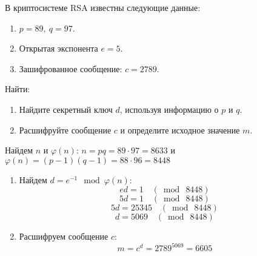 \begin{problem}
    В криптосистеме RSA известны следующие данные:
    \begin{enumerate}
        \item $p = 89, \ q = 97$.
        \item Открытая экспонента $e = 5$.
        \item Зашифрованное сообщение: $c = 2789$.
    \end{enumerate}
    Найти:
    \begin{enumerate}
        \item Найдите секретный ключ $d$, используя информацию о $p$ и $q$.
        \item Расшифруйте сообщение $c$ и определите исходное значение $m$.
    \end{enumerate}
\end{problem}
\begin{solution}
    Найдем $n$ и $\varphi(n)$: \( n = pq = 89 \cdot 97 = 8633 \) и \( \varphi(n) = (p - 1)(q - 1) = 88 \cdot 96 = 8448 \)
    \begin{enumerate}
        \item Найдем \(d = e^{-1} \mod \varphi(n) \):
        \[
            ed = 1 \quad ( \bmod \ 8448 )
        \]
        \[
        5d = 1 \quad ( \bmod \ 8448 )
        \]
        \[
        5d = 25345 \quad ( \bmod \ 8448 )
        \]
        \[
        d = 5069 \quad ( \bmod \ 8448 )
        \]
        \item Расшифруем сообщение $c$:
        \[
            m = c^d = 2789^{5069} = 6605
        \]
        
    \end{enumerate}
\end{solution}
